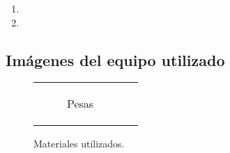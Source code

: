 \documentclass[../main.tex]{subfiles}
\begin{document}
\begin{enumerate}
    \item 
    \item 
\end{enumerate}

\subsection*{Imágenes del equipo utilizado}

\begin{figure}[H]

    \begin{tabular}{c c}
        
    \begin{subfigure}{0.5\textwidth} 
        \centering
        \caption{Pesas}
        \label{fig:pesas}
    \end{subfigure}
   
    \end{tabular}
    
    \caption{Materiales utilizados.}
    \label{fig:materiales}
\end{figure}
\end{document}
